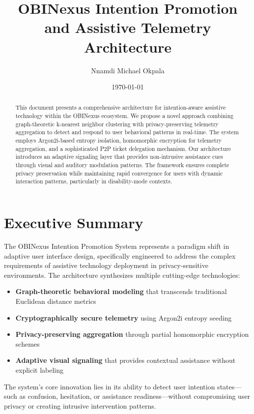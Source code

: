 \documentclass[11pt,a4paper]{article}
\title{OBINexus Intention Promotion and Assistive Telemetry Architecture}
\author{Nnamdi Michael Okpala}
\date{\today}
\begin{document}
\maketitle

\begin{abstract}
This document presents a comprehensive architecture for intention-aware assistive technology within the OBINexus ecosystem. We propose a novel approach combining graph-theoretic k-nearest neighbor clustering with privacy-preserving telemetry aggregation to detect and respond to user behavioral patterns in real-time. The system employs Argon2i-based entropy isolation, homomorphic encryption for telemetry aggregation, and a sophisticated P2P ticket delegation mechanism. Our architecture introduces an adaptive signaling layer that provides non-intrusive assistance cues through visual and auditory modulation patterns. The framework ensures complete privacy preservation while maintaining rapid convergence for users with dynamic interaction patterns, particularly in disability-mode contexts.
\end{abstract}

\tableofcontents
\newpage

\section{Executive Summary}

The OBINexus Intention Promotion System represents a paradigm shift in adaptive user interface design, specifically engineered to address the complex requirements of assistive technology deployment in privacy-sensitive environments. The architecture synthesizes multiple cutting-edge technologies:

\begin{itemize}
    \item \textbf{Graph-theoretic behavioral modeling} that transcends traditional Euclidean distance metrics
    \item \textbf{Cryptographically secure telemetry} using Argon2i entropy seeding
    \item \textbf{Privacy-preserving aggregation} through partial homomorphic encryption schemes
    \item \textbf{Adaptive visual signaling} that provides contextual assistance without explicit labeling
\end{itemize}

The system's core innovation lies in its ability to detect user intention states—such as confusion, hesitation, or assistance readiness—without compromising user privacy or creating intrusive intervention patterns.
\end{document}
